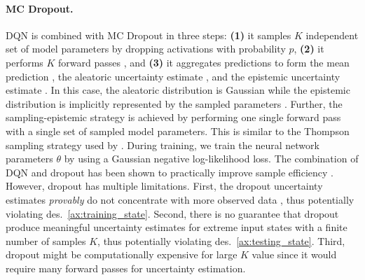 \paragraph{MC Dropout.} DQN is combined with MC Dropout \cite{dropout} in three steps: \textbf{(1)} it samples $K$ independent set of model parameters  by dropping activations with probability $p$, \textbf{(2)} it performs $K$ forward passes , and \textbf{(3)} it aggregates predictions to form the mean prediction , the aleatoric uncertainty estimate , and the epistemic uncertainty estimate . In this case, the aleatoric distribution is Gaussian while the epistemic distribution is implicitly represented by the sampled parameters . Further, the sampling-epistemic strategy is achieved by performing one single forward pass with a single set of sampled model parameters. This is similar to the Thompson sampling strategy used by \cite{dropout}. During training, we train the neural network parameters $\theta$ by using a Gaussian negative log-likelihood loss. The combination of DQN and dropout has been shown to practically improve sample efficiency \cite{dropout}. However, dropout has multiple limitations. First, the dropout uncertainty estimates \emph{provably} do not concentrate with more observed data \cite{randomized-prior-functions}, thus potentially violating des.~\ref{ax:training_state}. Second, there is no guarantee that dropout produce meaningful uncertainty estimates for extreme input states with a finite number of samples $K$, thus potentially violating des.~\ref{ax:testing_state}. Third, dropout might be computationally expensive for large $K$ value since it would require many forward passes for uncertainty estimation.

